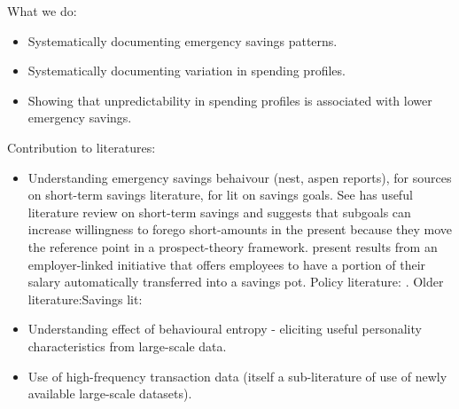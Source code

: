 What we do: 
\begin{itemize}

    \item Systematically documenting emergency savings patterns.

    \item Systematically documenting variation in spending profiles.

    \item Showing that unpredictability in spending profiles is
        associated with lower emergency savings.

\end{itemize}


Contribution to literatures:
\begin{itemize}

    \item Understanding emergency savings behaivour (nest, aspen
        reports), \citep{sabat2019rules} for sources on short-term savings
        literature, \citet{colby2013savings} for lit on savings goals.  See
        \citet{colby2013savings} has useful literature review on short-term
        savings and suggests that subgoals can increase willingness to forego
        short-amounts in the present because they move the reference point in a
        prospect-theory framework. \citet{philipps2021supporting} present
        results from an employer-linked initiative that offers employees to
        have a portion of their salary automatically transferred into a savings
        pot. Policy literature: \citep{can2019improving,cfpb2017financial,
        mps2018building}. Older literature:Savings lit:
        \citet{lunt1991psychological, oaten2007improvements}

    \item Understanding effect of behavioural entropy - eliciting
        useful personality characteristics from large-scale data.

    \item Use of high-frequency transaction data (itself a
        sub-literature of use of newly available large-scale datasets).

\end{itemize}

